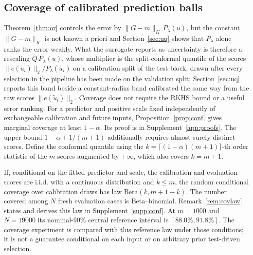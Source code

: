 \subsection{Coverage of calibrated prediction balls}
\label{sec:theory-conf}
Theorem~\ref{thm:or} controls the error by $\|G-m\|_K\,P_\lambda(u)$, but
the constant $\|G-m\|_K$ is not known a priori and
Section~\ref{sec:uq} shows that $P_\lambda$ alone ranks the error weakly.
What the surrogate reports as uncertainty is therefore a rescaling
$Q\,P_\lambda(u)$, whose multiplier is the split-conformal quantile of the
scores $\|e(\tilde u_i)\|_2/P_\lambda(\tilde u_i)$ on a calibration split of
the test block, drawn after every selection in the pipeline has been made
on the validation split; Section~\ref{sec:uq} reports this band beside a
constant-radius band calibrated the same way from the raw scores
$\|e(\tilde u_i)\|_2$. Coverage does not require the RKHS bound or a useful error ranking. For a predictor and positive scale fixed independently of exchangeable calibration and future inputs, Proposition~\ref{prop:conf} gives marginal coverage at least $1-\alpha$. Its proof is in Supplement~\ref{app:proofs}. The upper bound $1-\alpha+1/(m+1)$ additionally requires almost surely distinct scores. Define the conformal quantile using the $k=\lceil(1-\alpha)(m+1)\rceil$-th order statistic of the $m$ scores augmented by $+\infty$, which also covers $k=m+1$.

If, conditional on the fitted predictor and scale, the calibration and evaluation scores are i.i.d. with a continuous distribution and $k\le m$, the random conditional coverage over calibration draws has law $\mathrm{Beta}(k,m+1-k)$. The number covered among $N$ fresh evaluation cases is Beta--binomial. Remark~\ref{rem:covlaw} states and derives this law in Supplement~\ref{supp:conf}. At $m=1000$ and $N=19000$ its nominal-90\% central reference interval is $[88.0\%,91.8\%]$. The coverage experiment is compared with this reference law under those conditions; it is not a guarantee conditional on each input or on arbitrary prior test-driven selection.
